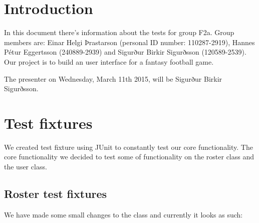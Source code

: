 \documentclass{article}
\begin{document}
\section{Introduction}
In this document there's information about the tests for group F2a. Group members are: Einar Helgi Þrastarson (personal ID number: 110287-2919), Hannes Pétur Eggertsson (240889-2939) and Sigurður Birkir Sigurðsson (120589-2539). Our project is to build an user interface for a fantasy football game.

The presenter on Wednesday, March 11th 2015, will be Sigurður Birkir Sigurðsson.

\section{Test fixtures}
We created test fixture using JUnit to constantly test our core functionality. The core functionality we decided to test some of functionality on the roster class and the user class.

\subsection{Roster test fixtures}
We have made some small changes to the class and currently it looks as such:
\end{document}
